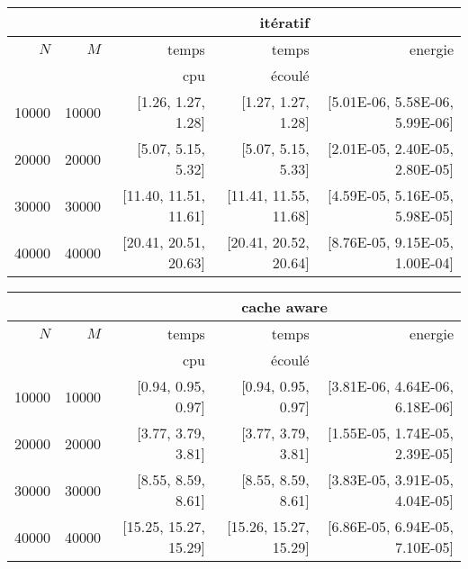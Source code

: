 \documentclass[10pt,a4paper]{article}
\begin{document}
\begin{center}
    \begin{tabular}{|r|r||r|r|r||}
    \hline
     \multicolumn{2}{|c||}{ } 
    & \multicolumn{3}{c||}{itératif}
    \\ \hline
    $N$ & $M$ 
    & temps   & temps & energie       %
    \\
    & 
    & cpu     & écoulé&               %
    \\ \hline
    \hline
    10000 & 10000 
    & [1.26, 1.27, 1.28] & [1.27, 1.27, 1.28] & [5.01E-06, 5.58E-06, 5.99E-06]  %
    \\ \hline
    20000 & 20000 
    & [5.07, 5.15, 5.32] & [5.07, 5.15, 5.33] & [2.01E-05, 2.40E-05, 2.80E-05]  %
    \\ \hline
    30000 & 30000 
    & [11.40, 11.51, 11.61] & [11.41, 11.55, 11.68] & [4.59E-05, 5.16E-05, 5.98E-05]  %
    \\ \hline
    40000 & 40000 
    & [20.41, 20.51, 20.63] & [20.41, 20.52, 20.64] & [8.76E-05, 9.15E-05, 1.00E-04]  %
    \\ \hline
    \hline
    \end{tabular}
    
    \medskip
    
    \begin{tabular}{|r|r||r|r|r||}
    \hline
     \multicolumn{2}{|c||}{ } 
    & \multicolumn{3}{c||}{cache aware}
    \\ \hline
    $N$ & $M$ 
    & temps   & temps & energie       %
    \\
    & 
    & cpu     & écoulé&               %
    \\ \hline
    \hline
    10000 & 10000 
    & [0.94, 0.95, 0.97] & [0.94, 0.95, 0.97] & [3.81E-06, 4.64E-06, 6.18E-06]  %
    \\ \hline
    20000 & 20000 
    & [3.77, 3.79, 3.81] & [3.77, 3.79, 3.81] & [1.55E-05, 1.74E-05, 2.39E-05]  %
    \\ \hline
    30000 & 30000 
    & [8.55, 8.59, 8.61] & [8.55, 8.59, 8.61] & [3.83E-05, 3.91E-05, 4.04E-05]  %
    \\ \hline
    40000 & 40000 
    & [15.25, 15.27, 15.29] & [15.26, 15.27, 15.29] & [6.86E-05, 6.94E-05, 7.10E-05]  %
    \\ \hline
    \hline
    \end{tabular}
    
    \medskip
    

\end{center}
\end{document}
